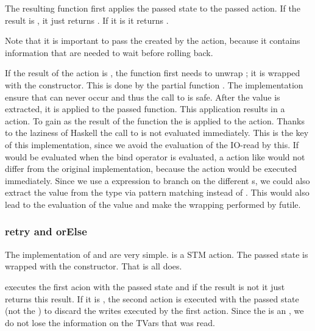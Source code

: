 The resulting function first applies the passed state to the passed action. 
If the result is , it just returns . If it is
 it returns . 

Note that it is important to 
pass the  created by the action, because it contains information that
are needed to wait before rolling back. 

If the result of the action is 
, the function first needs to unwrap ; it is wrapped with 
the  constructor. This is done by the partial function . The
implementation ensure that  can never occur and thus the call to 
 is safe. After the value is extracted, it is applied to the passed 
function. This application results in a  action. To gain  as 
the result of the function the  is applied to the action.
Thanks to the laziness of Haskell the call to  is not evaluated 
immediately. This is the key of this implementation, since we avoid the evaluation of 
the IO-read by this. If  would be evaluated when the bind operator is evaluated,
a action like  would not differ from the original implementation,
because the  action would be executed immediately. 
Since we use a  expression to branch on the different s, we 
could also extract the value from the  type  via pattern matching instead 
of . This would also lead to the evaluation of the value and 
make the wrapping performed by  futile.

\subsubsection{retry and orElse}
The implementation of  and  are very simple. 
 is a STM action. The passed state is wrapped with the  constructor.
That is all  does. 

 executes the first acion with the passed state and if the result is not 
 it just returns this result. If it is ,
the second action is executed with the passed state (not the ) to discard the 
writes executed by the first action. Since the  is an , 
we do not lose the information on the TVars that was read. 



